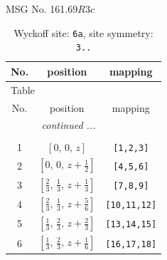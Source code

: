 \documentclass[fleqn,8pt]{jsarticle}
\begin{document}
\setcounter{MaxMatrixCols}{32}

\renewcommand{\tablename}{Table~}
\renewcommand{\figurename}{Figure~}
\begin{center}
\LARGE
MSG No. 161.69\quad$R3c$
\end{center}
\renewcommand{\arraystretch}{1.2}
\begin{longtable}{ccc}
\caption{Wyckoff site: {\tt 6a}, site symmetry: {\tt 3..}}
 \\
 \hline \hline
No. & position & mapping \\ \hline \endfirsthead

\multicolumn{2}{l}{\tablename\ \thetable{}} \\
 \hline \hline
No. & position & mapping \\ \hline \endhead

 \hline \hline
\multicolumn{2}{r}{\footnotesize\it continued ...} \\ \endfoot

 \hline \hline
\multicolumn{2}{r}{} \\ \endlastfoot

1 & $\left[ 0,\, 0,\, z \right]$ & {\tt [1,2,3]} \\ \hline
2 & $\left[ 0,\, 0,\, z + \frac{1}{2} \right]$ & {\tt [4,5,6]} \\ \hline
3 & $\left[ \frac{2}{3},\, \frac{1}{3},\, z + \frac{1}{3} \right]$ & {\tt [7,8,9]} \\ \hline
4 & $\left[ \frac{2}{3},\, \frac{1}{3},\, z + \frac{5}{6} \right]$ & {\tt [10,11,12]} \\ \hline
5 & $\left[ \frac{1}{3},\, \frac{2}{3},\, z + \frac{2}{3} \right]$ & {\tt [13,14,15]} \\ \hline
6 & $\left[ \frac{1}{3},\, \frac{2}{3},\, z + \frac{1}{6} \right]$ & {\tt [16,17,18]} \\
\end{longtable}
\renewcommand{\arraystretch}{1.2}
\end{document}
